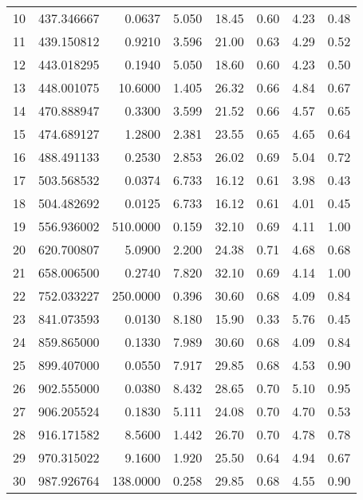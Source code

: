 {\begin{longtable}{rrrrrrrr}
10    &   437.346667&    0.0637&  5.050&   18.45&   0.60&  4.23&  0.48\\
11    &   439.150812&    0.9210&  3.596&   21.00&   0.63&  4.29&  0.52\\
12    &   443.018295&    0.1940&  5.050&   18.60&   0.60&  4.23&  0.50\\
13    &   448.001075&   10.6000&  1.405&   26.32&   0.66&  4.84&  0.67\\
14    &   470.888947&    0.3300&  3.599&   21.52&   0.66&  4.57&  0.65\\
15    &   474.689127&    1.2800&  2.381&   23.55&   0.65&  4.65&  0.64\\
16    &   488.491133&    0.2530&  2.853&   26.02&   0.69&  5.04&  0.72\\
17    &   503.568532&    0.0374&  6.733&   16.12&   0.61&  3.98&  0.43\\
18    &   504.482692&    0.0125&  6.733&   16.12&   0.61&  4.01&  0.45\\
19    &   556.936002&  510.0000&  0.159&   32.10&   0.69&  4.11&  1.00\\
20    &   620.700807&    5.0900&  2.200&   24.38&   0.71&  4.68&  0.68\\
21    &   658.006500&    0.2740&  7.820&   32.10&   0.69&  4.14&  1.00\\
22    &   752.033227&  250.0000&  0.396&   30.60&   0.68&  4.09&  0.84\\
23    &   841.073593&    0.0130&  8.180&   15.90&   0.33&  5.76&  0.45\\
24    &   859.865000&    0.1330&  7.989&   30.60&   0.68&  4.09&  0.84\\
25    &   899.407000&    0.0550&  7.917&   29.85&   0.68&  4.53&  0.90\\
26    &   902.555000&    0.0380&  8.432&   28.65&   0.70&  5.10&  0.95\\
27    &   906.205524&    0.1830&  5.111&   24.08&   0.70&  4.70&  0.53\\
28    &   916.171582&    8.5600&  1.442&   26.70&   0.70&  4.78&  0.78\\
29    &   970.315022&    9.1600&  1.920&   25.50&   0.64&  4.94&  0.67\\
30    &   987.926764&  138.0000&  0.258&   29.85&   0.68&  4.55&  0.90\\
\hline
\end{longtable}


}
